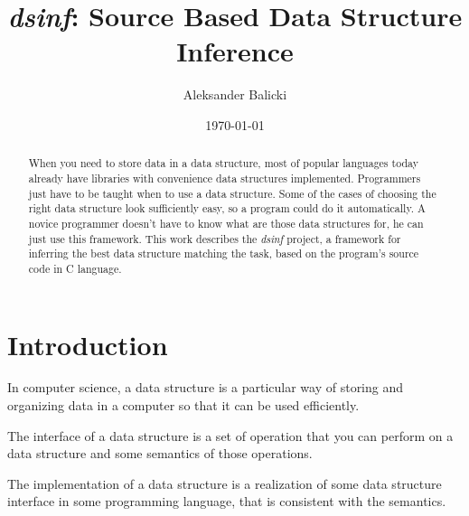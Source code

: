 \documentclass[a4paper,11pt]{article}
\title{\emph{dsinf}: Source Based Data Structure Inference}
\author{Aleksander Balicki}
\date{\today}
\begin{document}
\vfill

\maketitle

\begin{abstract}

    When you need to store data in a data structure, most of popular languages today already have libraries with
    convenience data structures implemented. Programmers just have to be taught when to use a data structure. Some of
    the cases of choosing the right data structure look sufficiently easy, so a program could do it automatically. A
    novice programmer doesn't have to know what are those data structures for, he can just use this framework.  This
    work describes the \emph{dsinf} project, a framework for inferring the best data structure matching the task, based
    on the program's source code in C language. 

\end{abstract}

\pagebreak

\tableofcontents

\vfill

\section{Introduction} \label{sec:intro}
	In computer science, a data structure is a particular way of storing and organizing data in a computer so that
	it can be used efficiently\cite{Wi}.

	The interface of a data structure is a set of operation that you can perform on a data structure and some
	semantics of those operations.

	The implementation of a data structure is a realization of some data structure interface in some programming
	language, that is consistent with the semantics.
\end{document}
